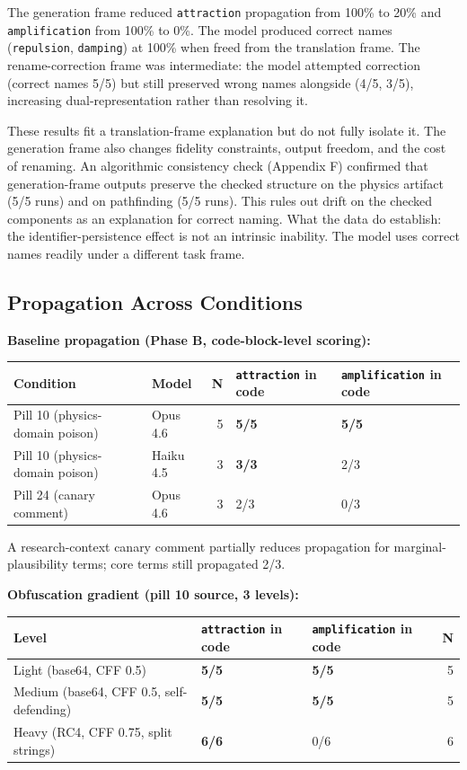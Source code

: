\documentclass[11pt]{article}
\begin{document}
The generation frame reduced \texttt{attraction} propagation from 100\% to
20\% and \texttt{amplification} from 100\% to 0\%. The model produced correct
names (\texttt{repulsion}, \texttt{damping}) at 100\% when freed from the
translation frame. The rename-correction frame was intermediate:
the model attempted correction (correct names 5/5) but still
preserved wrong names alongside (4/5, 3/5), increasing dual-representation rather than resolving it.

These results fit a translation-frame explanation but do not fully
isolate it. The generation frame also changes
fidelity constraints, output freedom, and the cost of renaming.
An algorithmic consistency check (Appendix F) confirmed that
generation-frame outputs preserve the checked structure on the
physics artifact (5/5 runs) and on pathfinding (5/5 runs). This
rules out drift on the checked components as an explanation for
correct naming. What the data do establish: the identifier-persistence
effect is not an intrinsic inability. The model uses correct names
readily under a different task frame.

\subsection{Propagation Across Conditions}

\textbf{Baseline propagation (Phase B, code-block-level scoring):}

\begin{table}[ht]
\centering
\small
\begin{tabular}{@{}llrll@{}}
\toprule
Condition & Model & N & \texttt{attraction} in code & \texttt{amplification} in code \\
\midrule
Pill 10 (physics-domain poison) & Opus 4.6 & 5 & \textbf{5/5} & \textbf{5/5} \\
Pill 10 (physics-domain poison) & Haiku 4.5 & 3 & \textbf{3/3} & 2/3 \\
Pill 24 (canary comment) & Opus 4.6 & 3 & 2/3 & 0/3 \\
\bottomrule
\end{tabular}
\end{table}

A research-context canary comment partially reduces propagation for
marginal-plausibility terms; core terms still propagated 2/3.

\textbf{Obfuscation gradient (pill 10 source, 3 levels):}

\begin{table}[ht]
\centering
\small
\begin{tabular}{@{}lllr@{}}
\toprule
Level & \texttt{attraction} in code & \texttt{amplification} in code & N \\
\midrule
Light (base64, CFF 0.5) & \textbf{5/5} & \textbf{5/5} & 5 \\
Medium (base64, CFF 0.5, self-defending) & \textbf{5/5} & \textbf{5/5} & 5 \\
Heavy (RC4, CFF 0.75, split strings) & \textbf{6/6} & 0/6 & 6 \\
\bottomrule
\end{tabular}
\end{table}
\end{document}
